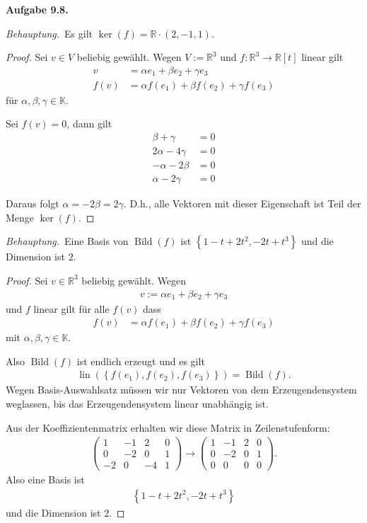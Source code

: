 \documentclass[12pt]{extarticle}
\newcommand{\mg}[1]{\mathbb{#1}}
\newcommand{\lin}{\operatorname{lin}}
\newcommand{\aufgn}[1]{\textbf{Aufgabe #1.}}
\newcommand{\beh}{\textit{Behauptung.}\ }
\begin{document}
\aufgn{9.8}

\beh Es gilt \(\ker (f) = \mg{R} \cdot (2, -1, 1) \).

\begin{proof}
  Sei \(v \in V\) beliebig gewählt.  Wegen
  \(V := \mg{R}^3\) und \(f\colon \mg{R}^3 \to \mg{R}[t]\)
  linear gilt
\begin{align*}
  v &= \alpha e_1 + \beta e_2 + \gamma  e_3 \\
  f(v) &= \alpha f(e_1) + \beta f(e_2) + \gamma f(e_3)
\end{align*} für \(\alpha, \beta, \gamma \in \mg{K}\).

Sei \(f(v) = 0\), dann gilt
\begin{align*}
  \beta + \gamma &= 0\\
  2\alpha - 4\gamma &= 0\\
  -\alpha - 2 \beta &= 0\\
  \alpha - 2\gamma &= 0
\end{align*}

Daraus folgt \(\alpha = -2 \beta = 2\gamma\).  D.h., alle
Vektoren mit dieser Eigenschaft ist Teil der Menge
\(\ker(f)\).
\end{proof}

\beh Eine Basis von \(\operatorname{Bild}(f)\) ist
\(\left\{ 1-t+2t^2 , -2t + t^3 \right\}\) und die
Dimension ist \(2\).

\begin{proof}
  Sei \(v \in \mg{R}^3\) beliebig gewählt.  Wegen
\begin{align*}
v := \alpha e_1 + \beta e_2 + \gamma e_3
\end{align*} und \(f\) linear gilt für alle \(f(v)\) dass
\begin{align*}
  f(v) &= \alpha f(e_1) + \beta f(e_2) + \gamma f(e_3)
\end{align*} mit \(\alpha, \beta, \gamma \in \mg{K}\).

Also \(\operatorname{Bild}(f)\) ist endlich erzeugt und
es gilt
\begin{align*}
  \lin (\left\{ f(e_1), f(e_2), f(e_3) \right\} )
  = \operatorname{Bild}(f).
\end{align*}
Wegen Basis-Auswahlsatz müssen wir nur Vektoren von dem
Erzeugendensystem weglassen, bis das Erzeugendensystem
linear unabhängig ist.

  Aus der Koeffizientenmatrix erhalten wir diese Matrix
  in Zeilenstufenform:
\begin{align*}
\begin{pmatrix}
  1 & -1 & 2 & 0 \\
  0 & -2 & 0 & 1 \\
  -2 & 0 & -4 & 1
\end{pmatrix} \to
\begin{pmatrix}
  1 & -1 & 2 & 0 \\
  0 & -2 & 0 & 1 \\
  0 & 0 & 0 & 0
\end{pmatrix}.
\end{align*}
Also eine Basis ist
\begin{align*}
\left\{ 1-t+2t^2 , -2t + t^3 \right\}
\end{align*}
und die Dimension ist \(2\).
\end{proof}
\end{document}
